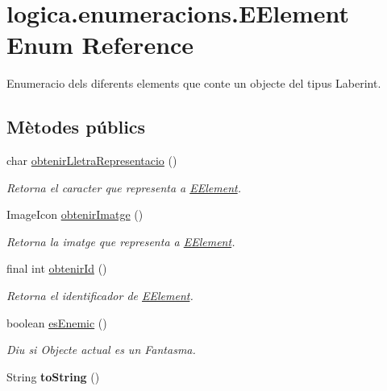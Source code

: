 \hypertarget{enumlogica_1_1enumeracions_1_1_e_element}{\section{logica.\+enumeracions.\+E\+Element Enum Reference}
\label{enumlogica_1_1enumeracions_1_1_e_element}
}


Enumeracio dels diferents elements que conte un objecte del tipus Laberint.  


\subsection*{Mètodes públics}
\begin{DoxyCompactItemize}
\item 
char \hyperlink{enumlogica_1_1enumeracions_1_1_e_element_a7a4bc5ca2a0a984a29cbc7bf9988d4aa}{obtenir\+Lletra\+Representacio} ()
\begin{DoxyCompactList}\small\item\em Retorna el caracter que representa a \hyperlink{enumlogica_1_1enumeracions_1_1_e_element}{E\+Element}. \end{DoxyCompactList}\item 
\hypertarget{enumlogica_1_1enumeracions_1_1_e_element_a9b55cc7b129ffff7c1c03aef465f32a7}{Image\+Icon \hyperlink{enumlogica_1_1enumeracions_1_1_e_element_a9b55cc7b129ffff7c1c03aef465f32a7}{obtenir\+Imatge} ()}\label{enumlogica_1_1enumeracions_1_1_e_element_a9b55cc7b129ffff7c1c03aef465f32a7}

\begin{DoxyCompactList}\small\item\em Retorna la imatge que representa a \hyperlink{enumlogica_1_1enumeracions_1_1_e_element}{E\+Element}. \end{DoxyCompactList}\item 
final int \hyperlink{enumlogica_1_1enumeracions_1_1_e_element_ace3c605008e8ec150845687493323df2}{obtenir\+Id} ()
\begin{DoxyCompactList}\small\item\em Retorna el identificador de \hyperlink{enumlogica_1_1enumeracions_1_1_e_element}{E\+Element}. \end{DoxyCompactList}\item 
boolean \hyperlink{enumlogica_1_1enumeracions_1_1_e_element_abac9b105a574e82ffaac64636c40b8e8}{es\+Enemic} ()
\begin{DoxyCompactList}\small\item\em Diu si Objecte actual es un Fantasma. \end{DoxyCompactList}\item 
\hypertarget{enumlogica_1_1enumeracions_1_1_e_element_a8f501522d71ec7107069a9f2d8faeb8b}{String {\bfseries to\+String} ()}\label{enumlogica_1_1enumeracions_1_1_e_element_a8f501522d71ec7107069a9f2d8faeb8b}

\end{DoxyCompactItemize}
